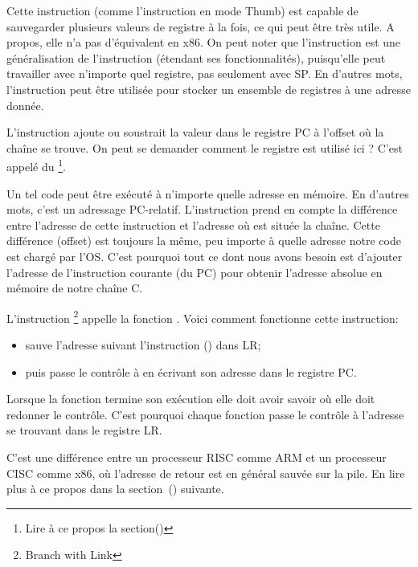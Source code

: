 Cette instruction (comme l'instruction \PUSH en mode Thumb) est capable de
sauvegarder plusieurs valeurs de registre à la fois, ce qui peut être très utile.
A propos, elle n'a pas d'équivalent en x86.
On peut noter que l'instruction  est une généralisation de l'instruction
\PUSH (étendant ses fonctionnalités), puisqu'elle peut travailler avec n'importe
quel registre, pas seulement avec \ac{SP}.
En d'autres mots, l'instruction  peut être utilisée pour stocker un
ensemble de registres à une adresse donnée.

\myindex{\PICcode}
L'instruction 
ajoute ou soustrait la valeur dans le registre \ac{PC} à l'offset où la chaîne
 se trouve.
On peut se demander comment le registre  est utilisé ici ?
C'est appelé du \q{\PICcode}\footnote{Lire à ce propos la section()}.

Un tel code peut être exécuté à n'importe quelle adresse en mémoire.
En d'autres mots, c'est un adressage \ac{PC}-relatif. %
L'instruction  prend en compte la différence entre l'adresse de cette
instruction et l'adresse où est située la chaîne.
Cette différence (offset) est toujours la même, peu importe à quelle adresse
notre code est chargé par l'\ac{OS}.
C'est pourquoi tout ce dont nous avons besoin est d'ajouter l'adresse de l'instruction
courante (du \ac{PC}) pour obtenir l'adresse absolue en mémoire de notre chaîne C.

L'instruction \footnote{Branch with Link} appelle la fonction \printf.
Voici comment fonctionne cette instruction:

\begin{itemize}
\item sauve l'adresse suivant l'instruction  () dans \ac{LR};
\item puis passe le contrôle à \printf en écrivant son adresse dans le registre \ac{PC}.
\end{itemize}

Lorsque la fonction \printf termine son exécution elle doit avoir savoir où elle
doit redonner le contrôle.
C'est pourquoi chaque fonction passe le contrôle à l'adresse se trouvant dans le registre \ac{LR}.

C'est une différence entre un processeur \ac{RISC}  comme ARM et un
processeur \ac{CISC} comme x86, où l'adresse de retour est en général sauvée
sur la pile.
En lire plus à ce propos dans la section~() suivante.

